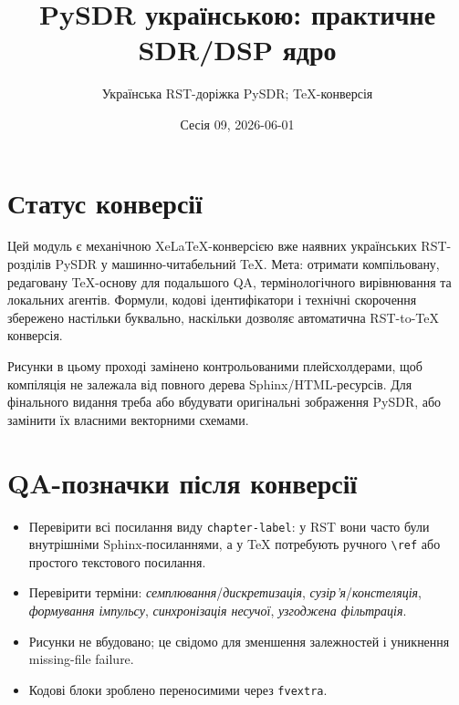 \documentclass[11pt,a4paper,oneside]{book}
\title{PySDR українською: практичне SDR/DSP ядро}
\author{Українська RST-доріжка PySDR; TeX-конверсія}
\date{Сесія 09, 2026-06-01}
\begin{document}
\maketitle
\frontmatter
\chapter*{Статус конверсії}
Цей модуль є механічною XeLaTeX-конверсією вже наявних українських RST-розділів PySDR у машинно-читабельний TeX. Мета: отримати компільовану, редаговану TeX-основу для подальшого QA, термінологічного вирівнювання та локальних агентів. Формули, кодові ідентифікатори і технічні скорочення збережено настільки буквально, наскільки дозволяє автоматична RST-to-TeX конверсія.

Рисунки в цьому проході замінено контрольованими плейсхолдерами, щоб компіляція не залежала від повного дерева Sphinx/HTML-ресурсів. Для фінального видання треба або вбудувати оригінальні зображення PySDR, або замінити їх власними векторними схемами.

\tableofcontents
\mainmatter











\appendix
\chapter{QA-позначки після конверсії}
\begin{itemize}
\item Перевірити всі посилання виду \texttt{chapter-label}: у RST вони часто були внутрішніми Sphinx-посиланнями, а у TeX потребують ручного \texttt{\textbackslash ref} або простого текстового посилання.
\item Перевірити терміни: \emph{семплювання}/\emph{дискретизація}, \emph{сузір'я}/\emph{констеляція}, \emph{формування імпульсу}, \emph{синхронізація несучої}, \emph{узгоджена фільтрація}.
\item Рисунки не вбудовано; це свідомо для зменшення залежностей і уникнення missing-file failure.
\item Кодові блоки зроблено переносимими через \texttt{fvextra}.
\end{itemize}
\end{document}
